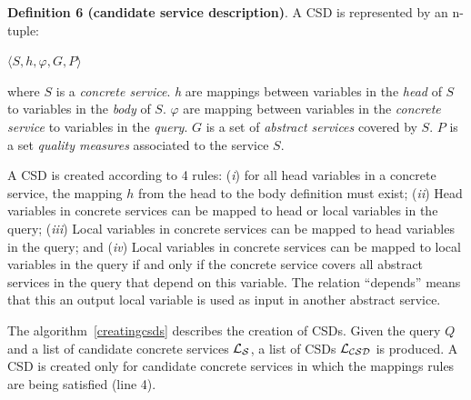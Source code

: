 \noindent \textbf{Definition 6 (candidate service description)}.
A CSD is represented by an n-tuple:
\begin{center}
$\langle S, h, \varphi, G, P\rangle$
\end{center}
where $S$ is a \textit{concrete service}. 
\textit{h} are mappings between variables in the \textit{head} of $S$ to variables in the \textit{body} of $S$. 
$\varphi$ are mapping between variables in the \textit{concrete service} to variables in the \textit{query}.
$G$ is a set of \textit{abstract services} covered by $S$. 
$P$ is a set \textit{quality measures} associated to the service $S$. 
 
A CSD is created according to 4 rules: (\textit{i}) for all head variables in a
concrete service, the mapping $h$ from the head to the body definition must
exist; (\textit{ii}) Head variables in concrete services can be mapped to head
or local variables in the query; (\textit{iii}) Local variables in concrete
services can be mapped to head variables in the query; and (\textit{iv}) Local
variables in concrete services can be mapped to local variables in the query if and only if the concrete service covers all abstract services in the query that depend on this variable. The relation ``depends''  means that this an output local variable is used as input in another abstract service.

The algorithm~\ref{creatingcsds} describes the creation of CSDs. Given the query $Q$ and a list of candidate concrete services $\hbox{${\cal L_{S}}$}$, a list of CSDs $\hbox{${\cal L_{CSD}}$}$ is produced. A  CSD is created only for candidate concrete services in which the mappings rules are being satisfied (line 4).
%

